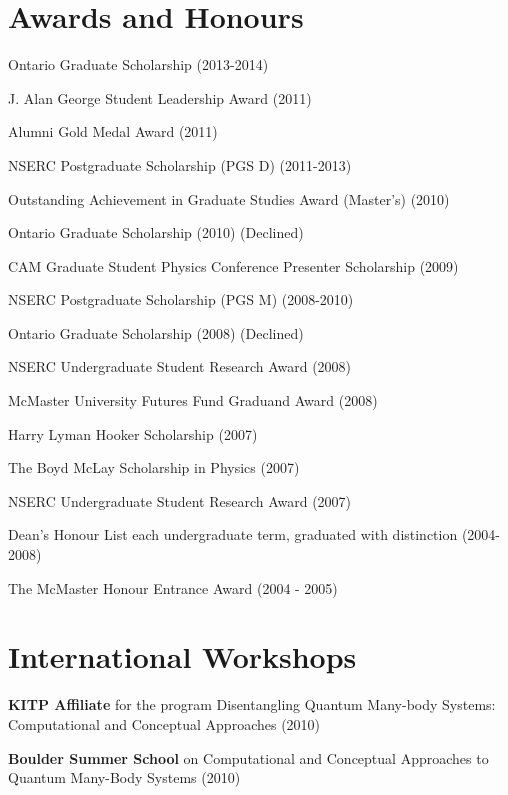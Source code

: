 \documentclass[letterpaper]{article}
\renewenvironment{itemize}{
  \begin{list}{}{
    \setlength{\leftmargin}{1.5em}
  }
}{
  \end{list}
}
\begin{document}
\section*{Awards and Honours}

\begin{itemize}

\item Ontario Graduate Scholarship (2013-2014)
\item J. Alan George Student Leadership Award (2011)
\item Alumni Gold Medal Award (2011)
\item NSERC Postgraduate Scholarship (PGS D) (2011-2013)
\item Outstanding Achievement in Graduate Studies Award (Master's) (2010)
\item Ontario Graduate Scholarship (2010) (Declined)
\item CAM Graduate Student Physics Conference Presenter Scholarship (2009)
\item NSERC Postgraduate Scholarship (PGS M) (2008-2010)
\item Ontario Graduate Scholarship (2008) (Declined)
\item NSERC Undergraduate Student Research Award (2008)
\item McMaster University Futures Fund Graduand Award (2008)
\item Harry Lyman Hooker Scholarship (2007)
\item The Boyd McLay Scholarship in Physics (2007)
\item NSERC Undergraduate Student Research Award (2007)
\item Dean's Honour List each undergraduate term, graduated with distinction (2004-2008)
\item The McMaster Honour Entrance Award (2004 - 2005)
\end{itemize}

\section*{International Workshops}

\begin{itemize}

\item {\bf KITP Affiliate} for the program Disentangling Quantum Many-body Systems: Computational and Conceptual Approaches (2010)

\item {\bf Boulder Summer School} on Computational and Conceptual Approaches
to Quantum Many-Body Systems (2010)

\end{itemize}
\end{document}
